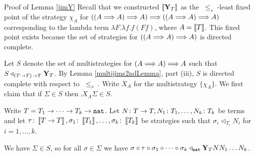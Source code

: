 \documentclass{entcs} \usepackage{prentcsmacro}
\newcommand{\stle}{{\;\le_s\;}}
\newcommand{\0}{{\mathtt{0}}}
\newcommand{\plot}{\triangleleft}
\newcommand{\Chi}{X}
\begin{document}
\begin{proof*}{Proof of Lemma \ref{jimY}}
  Recall that we constructed $\left\llbracket\mathbf{Y}_T\right\rrbracket$ as the $\stle$-least fixed point of the strategy $\chi_A$ for $((A\Longrightarrow A)\Longrightarrow A)\Longrightarrow((A\Longrightarrow A)\Longrightarrow A)$ corresponding to the lambda term $\lambda F.\lambda f.f(F f)$, where $A=\left\llbracket T\right\rrbracket$.  This fixed point exists because the set of strategies for $((A\Longrightarrow A)\Longrightarrow A)$ is directed complete.  

  Let $S$ denote the set of multistrategies for $(A\Longrightarrow A)\Longrightarrow A$ such that $S\plot_{(T\to T)\to T}\Y_T$.  By Lemma \ref{multijims2ndLemma}, part (iii), $S$ is directed complete with respect to $\stle$.  Write $\Chi_A$ for the multistrategy $\{\chi_A\}$.  We first claim that if $\Sigma\in S$ then $\comp{\Chi_A}{\Sigma}\in S$.

  Write $T=T_1\to\dots\to T_k\to{\mathtt{nat}}$.  Let $N\colon T\to T,N_1\colon T_1,\dots,N_k\colon T_k$ be terms and let $\tau\colon\left\llbracket T\to T\right\rrbracket,\sigma_1\colon\left\llbracket T_1\right\rrbracket,\dots,\sigma_k\colon\left\llbracket T_k\right\rrbracket$ be strategies such that $\sigma_i\plot_{T_i}N_i$ for $i=1,\dots,k$.  

  We have $\Sigma\in S$, so for all $\sigma\in\Sigma$ we have $\comp{\comp\sigma\tau}{\comp{\sigma_1}{\comp{\cdots}{\sigma_k}}}\plot_\nat\Y_TNN_1\dots N_k$.
\end{proof*}



\end{document}
